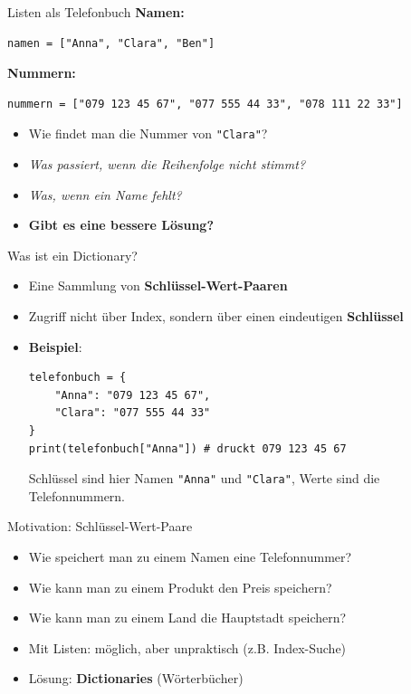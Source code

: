 \begin{frame}[fragile]{Listen als Telefonbuch}
	\textbf{Namen:}
	\begin{lstlisting}[basicstyle=\ttfamily\footnotesize]
	namen = ["Anna", "Clara", "Ben"]
\end{lstlisting}
	\textbf{Nummern:}
	\begin{lstlisting}[basicstyle=\ttfamily\footnotesize]
	nummern = ["079 123 45 67", "077 555 44 33", "078 111 22 33"]
\end{lstlisting}
	\begin{itemize}[<+->]
		\item Wie findet man die Nummer von \lstinline|"Clara"|?
		\item \textit{Was passiert, wenn die Reihenfolge nicht stimmt?}
		\item \textit{Was, wenn ein Name fehlt?}
		\item \begin{center}
			      \textbf{Gibt es eine bessere Lösung?}
		      \end{center}
	\end{itemize}
\end{frame}

\begin{frame}[fragile]{Was ist ein Dictionary?}
	\begin{itemize}[<+->]
		\item Eine Sammlung von \textbf{Schlüssel-Wert-Paaren}
		\item Zugriff nicht über Index, sondern über einen eindeutigen \textbf{Schlüssel} 
		\item \textbf{Beispiel}:
		      \begin{lstlisting}
telefonbuch = {
    "Anna": "079 123 45 67",
    "Clara": "077 555 44 33"
}
print(telefonbuch["Anna"]) # druckt 079 123 45 67
	\end{lstlisting}
		      Schlüssel sind hier Namen \lstinline|"Anna"| und \lstinline|"Clara"|, Werte sind die Telefonnummern.
	\end{itemize}

\end{frame}

\begin{frame}{Motivation: Schlüssel-Wert-Paare}
	\begin{itemize}[<+->]
		\item Wie speichert man zu einem Namen eine Telefonnummer?
		\item Wie kann man zu einem Produkt den Preis speichern?
		\item Wie kann man zu einem Land die Hauptstadt speichern?
		\item Mit Listen: möglich, aber unpraktisch (z.B. Index-Suche)
		\item Lösung: \textbf{Dictionaries} (Wörterbücher)
	\end{itemize}
\end{frame}

